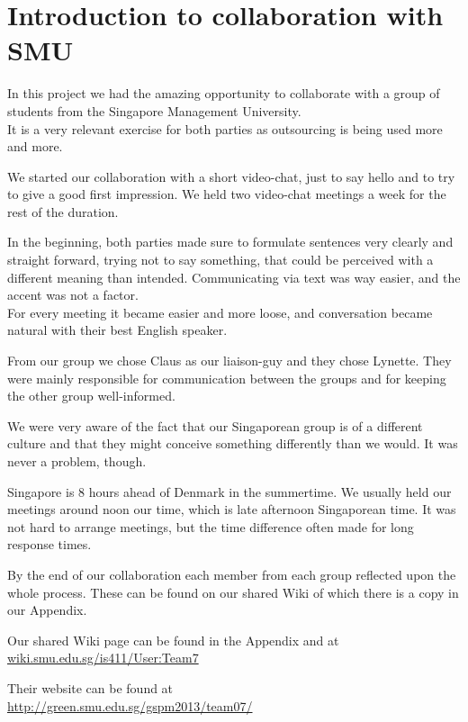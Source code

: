 \section{Introduction to collaboration with SMU}
In this project we had the amazing opportunity to collaborate with a group of students from the Singapore Management University.
\\It is a very relevant exercise for both parties as outsourcing is being used more and more.

We started our collaboration with a short video-chat, just to say hello and to try to give a good first impression. We held two video-chat meetings a week for the rest of the duration.

In the beginning, both parties made sure to formulate sentences very clearly and straight forward, trying not to say something, that could be perceived with a different meaning than intended. Communicating via text was way easier, and the accent was not a factor.
\\For every meeting it became easier and more loose, and conversation became natural with their best English speaker.

From our group we chose Claus as our liaison-guy and they chose Lynette. They were mainly responsible for communication between the groups and for keeping the other group well-informed.

We were very aware of the fact that our Singaporean group is of a different culture and that they might conceive something differently than we would. It was never a problem, though.

Singapore is 8 hours ahead of Denmark in the summertime. We usually held our meetings around noon our time, which is late afternoon Singaporean time. It was not hard to arrange meetings, but the time difference often made for long response times.

By the end of our collaboration each member from each group reflected upon the whole process. These can be found on our shared Wiki of which there is a copy in our Appendix.

Our shared Wiki page can be found in the Appendix and at
\\\url{wiki.smu.edu.sg/is411/User:Team7}

Their website can be found at
\\\url{http://green.smu.edu.sg/gspm2013/team07/}
\newpage